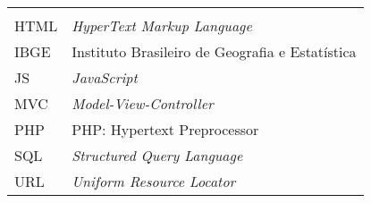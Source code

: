 
\begin{tabular}{ll}
\textbf{			} & \textbf{				}\\
HTML   & \it{HyperText Markup Language}\\
IBGE    & Instituto Brasileiro de Geografia e Estatística\\
JS	   & \it{JavaScript}\\
MVC	   & \it{Model-View-Controller}\\
PHP   & PHP: Hypertext Preprocessor\\
SQL	   & \it{Structured Query Language}\\
URL    & \it{Uniform Resource Locator}\\
\end{tabular}